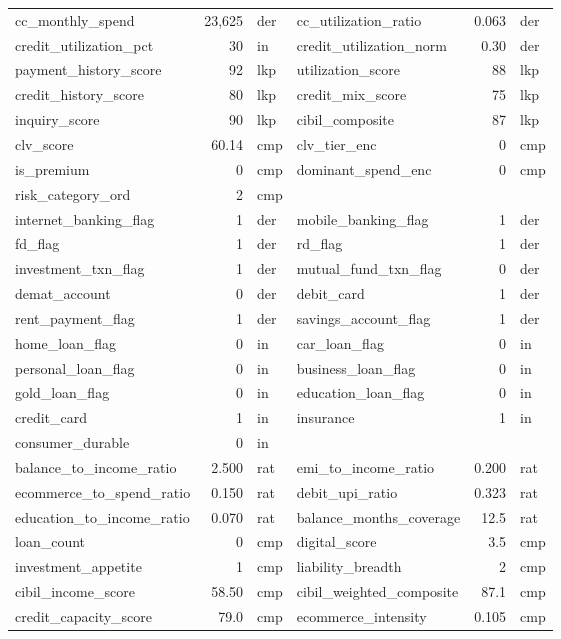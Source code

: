 \documentclass[12pt,a4paper]{article}
\begin{document}
\begin{longtable}{lrl|lrl}
cc\_monthly\_spend & 23{,}625 & der & cc\_utilization\_ratio & 0.063 & der \\
credit\_utilization\_pct & 30 & in & credit\_utilization\_norm & 0.30 & der \\
\midrule
payment\_history\_score & 92 & lkp & utilization\_score & 88 & lkp \\
credit\_history\_score & 80 & lkp & credit\_mix\_score & 75 & lkp \\
inquiry\_score & 90 & lkp & cibil\_composite & 87 & lkp \\
\midrule
clv\_score & 60.14 & cmp & clv\_tier\_enc & 0 & cmp \\
is\_premium & 0 & cmp & dominant\_spend\_enc & 0 & cmp \\
risk\_category\_ord & 2 & cmp & & & \\
\midrule
internet\_banking\_flag & 1 & der & mobile\_banking\_flag & 1 & der \\
fd\_flag & 1 & der & rd\_flag & 1 & der \\
investment\_txn\_flag & 1 & der & mutual\_fund\_txn\_flag & 0 & der \\
demat\_account & 0 & der & debit\_card & 1 & der \\
rent\_payment\_flag & 1 & der & savings\_account\_flag & 1 & der \\
\midrule
home\_loan\_flag & 0 & in & car\_loan\_flag & 0 & in \\
personal\_loan\_flag & 0 & in & business\_loan\_flag & 0 & in \\
gold\_loan\_flag & 0 & in & education\_loan\_flag & 0 & in \\
credit\_card & 1 & in & insurance & 1 & in \\
consumer\_durable & 0 & in & & & \\
\midrule
balance\_to\_income\_ratio & 2.500 & rat & emi\_to\_income\_ratio & 0.200 & rat \\
ecommerce\_to\_spend\_ratio & 0.150 & rat & debit\_upi\_ratio & 0.323 & rat \\
education\_to\_income\_ratio & 0.070 & rat & balance\_months\_coverage & 12.5 & rat \\
\midrule
loan\_count & 0 & cmp & digital\_score & 3.5 & cmp \\
investment\_appetite & 1 & cmp & liability\_breadth & 2 & cmp \\
cibil\_income\_score & 58.50 & cmp & cibil\_weighted\_composite & 87.1 & cmp \\
credit\_capacity\_score & 79.0 & cmp & ecommerce\_intensity & 0.105 & cmp \\

\end{longtable}
\end{document}
